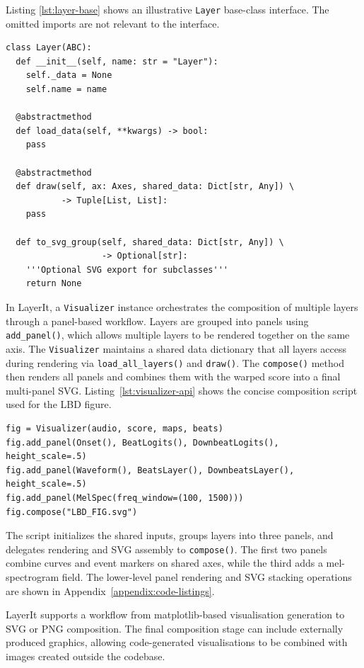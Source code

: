 Listing \ref{lst:layer-base} shows an illustrative \texttt{Layer} base-class interface. The omitted imports are not relevant to the interface.

\pagebreak

\begin{lstlisting}[caption={Layer interface (concise)},label={lst:layer-base}]
class Layer(ABC):
  def __init__(self, name: str = "Layer"):
    self._data = None
    self.name = name

  @abstractmethod
  def load_data(self, **kwargs) -> bool:
    pass

  @abstractmethod
  def draw(self, ax: Axes, shared_data: Dict[str, Any]) \
           -> Tuple[List, List]:
    pass

  def to_svg_group(self, shared_data: Dict[str, Any]) \
                   -> Optional[str]:
    '''Optional SVG export for subclasses'''
    return None
\end{lstlisting}

In LayerIt, a \texttt{Visualizer} instance orchestrates the composition of multiple layers through a panel-based workflow. Layers are grouped into panels using \texttt{add\_panel()}, which allows multiple layers to be rendered together on the same axis. The \texttt{Visualizer} maintains a shared data dictionary that all layers access during rendering via \texttt{load\_all\_layers()} and \texttt{draw()}. The \texttt{compose()} method then renders all panels and combines them with the warped score into a final multi-panel SVG. Listing~\ref{lst:visualizer-api} shows the concise composition script used for the LBD figure.

\begin{lstlisting}[caption={Concise LayerIt composition script},label={lst:visualizer-api}]
fig = Visualizer(audio, score, maps, beats)
fig.add_panel(Onset(), BeatLogits(), DownbeatLogits(), height_scale=.5)
fig.add_panel(Waveform(), BeatsLayer(), DownbeatsLayer(), height_scale=.5)
fig.add_panel(MelSpec(freq_window=(100, 1500)))
fig.compose("LBD_FIG.svg")
\end{lstlisting}

The script initializes the shared inputs, groups layers into three panels, and delegates rendering and SVG assembly to \texttt{compose()}. The first two panels combine curves and event markers on shared axes, while the third adds a mel-spectrogram field. The lower-level panel rendering and SVG stacking operations are shown in Appendix~\ref{appendix:code-listings}.

LayerIt supports a workflow from matplotlib-based visualisation generation to SVG or PNG composition. The final composition stage can include externally produced graphics, allowing code-generated visualisations to be combined with images created outside the codebase.

